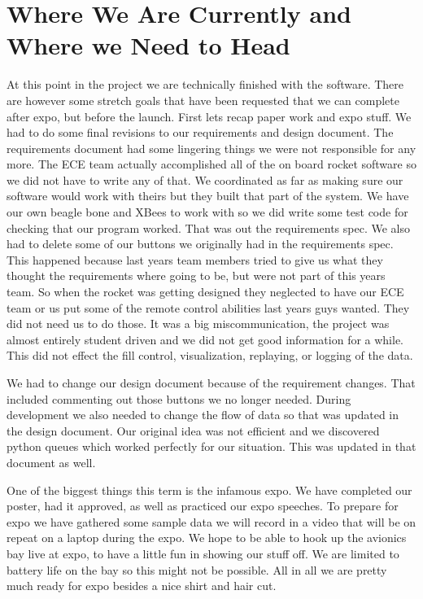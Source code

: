 \documentclass[10pt,draftclsnofoot,onecolumn]{IEEEtran}
\begin{document}
\section{Where We Are Currently and Where we Need to Head}
At this point in the project we are technically finished with the software. There are however some stretch goals that have been requested that we can complete after expo, but before the launch. First lets recap paper work and expo stuff. We had to do some final revisions to our requirements and design document. The requirements document had some lingering things we were not responsible for any more. The ECE team actually accomplished all of the on board rocket software so we did not have to write any of that. We coordinated as far as making sure our software would work with theirs but they built that part of the system. We have our own beagle bone and XBees to work with so we did write some test code for checking that our program worked. That was out the requirements spec. We also had to delete some of our buttons we originally had in the requirements spec. This happened because last years team members tried to give us what they thought the requirements where going to be, but were not part of this years team. So when the rocket was getting designed they neglected to have our ECE team or us put some of the remote control abilities last years guys wanted. They did not need us to do those. It was a big miscommunication, the project was almost entirely student driven and we did not get good information for a while. This did not effect the fill control, visualization, replaying, or logging of the data. \par

We had to change our design document because of the requirement changes. That included commenting out those buttons we no longer needed. During development we also needed to change the flow of data so that was updated in the design document. Our original idea was not efficient and we discovered python queues which worked perfectly for our situation. This was updated in that document as well.\par

One of the biggest things this term is the infamous expo. We have completed our poster, had it approved, as well as practiced our expo speeches. To prepare for expo we have gathered some sample data we will record in a video that will be on repeat on a laptop during the expo. We hope to be able to hook up the avionics bay live at expo, to have a little fun in showing our stuff off. We are limited to battery life on the bay so this might not be possible. All in all we are pretty much ready for expo besides a nice shirt and hair cut. \par
\end{document}
